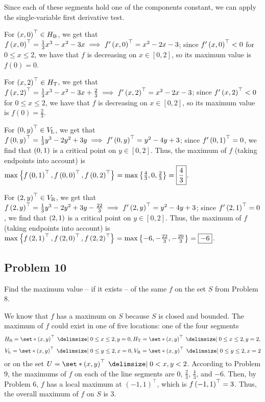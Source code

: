 \documentclass[main.tex]{subfiles}
\begin{document}
\begin{soln}
    Since each of these segments hold one of the components constant, we can apply the single-variable first derivative test.

    For $\left( x, 0 \right)^\top\in H_{\mathrm{B}}$, we get that $f\left( x, 0 \right)^\top = \frac{1}{3}x^3 - x^2 - 3x\implies f'\left( x, 0 \right)^\top = x^2 - 2x - 3$; since $f'\left( x, 0 \right)^\top < 0$ for $0\le x\le 2$, we have that $f$ is decreasing on $x\in [0, 2]$, so its maximum value is $f(0) = \boxed{0}$.

    For $\left( x, 2 \right)^\top\in H_{\mathrm{T}}$, we get that $f\left( x, 2 \right)^\top = \frac{1}{3}x^3 - x^2 - 3x + \frac{2}{3}\implies f'\left( x, 2 \right)^\top = x^2 - 2x - 3$; since $f'\left( x, 2 \right)^\top < 0$ for $0\le x\le 2$, we have that $f$ is decreasing on $x\in [0, 2]$, so its maximum value is $f(0) = \boxed{\frac{2}{3}}$.

    For $\left( 0, y \right)^\top\in V_{\mathrm{L}}$, we get that $f\left( 0, y \right)^\top = \frac{1}{3}y^3 - 2y^2 + 3y\implies f'\left( 0, y \right)^\top = y^2 - 4y + 3$; since $f'\left( 0, 1 \right)^\top = 0$, we find that $\left( 0, 1 \right)$ is a critical point on $y\in [0, 2]$. Thus, the maximum of $f$ (taking endpoints into account) is $\max\left\{ f\left( 0, 1 \right)^\top, f\left( 0, 0 \right)^\top, f\left( 0, 2 \right)^\top \right\} = \max\left\{ \frac{4}{3}, 0, \frac{2}{3} \right\} = \boxed{\frac{4}{3}}$.

    For $\left( 2, y \right)^\top\in V_{\mathrm{R}}$, we get that $f\left( 2, y \right)^\top = \frac{1}{3}y^3 - 2y^2 + 3y - \frac{22}{3}\implies f'\left( 2, y \right)^\top = y^2 - 4y + 3$; since $f'\left( 2, 1 \right)^\top = 0$, we find that $\left( 2, 1 \right)$ is a critical point on $y\in [0, 2]$. Thus, the maximum of $f$ (taking endpoints into account) is $\max\left\{ f\left( 2, 1 \right)^\top, f\left( 2, 0 \right)^\top, f\left( 2, 2 \right)^\top \right\} = \max\left\{ -6, -\frac{22}{3}, -\frac{20}{3} \right\} = \boxed{-6}$.
\end{soln}
\eject

\subsection{Problem 10}
\begin{claim}
    Find the maximum value -- if it exists -- of the same $f$ on the set $S$ from Problem 8.
\end{claim}

\begin{soln}
    We know that $f$ has a maximum on $S$ because $S$ is closed and bounded. The maximum of $f$ could exist in one of five locations: one of the four segments
    \[H_{\mathrm B} = \set*{\parens{x,y}^\top \mid 0 \le x \le 2, y = 0}, H_{\mathrm T} = \set*{\parens{x,y}^\top \mid 0 \le x \le 2, y = 2},\]
    \[V_{\mathrm L} = \set*{\parens{x,y}^\top \mid 0 \le y \le 2, x = 0}, V_{\mathrm R} = \set*{\parens{x,y}^\top \mid 0 \le y \le 2, x = 2}\]
    or on the set $U = \set*{\parens{x,y}^\top \mid 0 < x,y < 2}$. According to Problem 9, the maximums of $f$ on each of the line segments are $0$, $\frac{2}{3}$, $\frac{4}{3}$, and $-6$. Then, by Problem 6, $f$ has a local maximum at $(-1, 1)^\top$, which is $f\left( -1, 1 \right)^\top = 3$. Thus, the overall maximum of $f$ on $S$ is $\boxed{3}$.
\end{soln}
\eject
\end{document}
